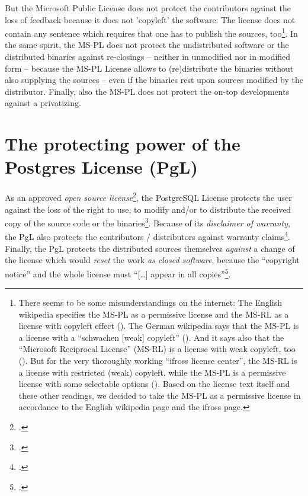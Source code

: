 But the Microsoft Public License does not protect the contributors against the
loss of feedback because it does not 'copyleft' the software: The license does
not contain any sentence which requires that one has to publish the sources,
too\footnote{There seems to be some misunderstandings on the internet: The
English wikipedia specifies the MS-PL as a permissive license and the MS-RL as a
license with copyleft effect (\cite[cf.][\nopage wp]{wpMsSharedSources2013a}).
The German wikipedia says that the MS-PL is a license with a \enquote{schwachen
[weak] copyleft} (\cite[cf.][\nopage wp]{wpMspl2013a}). And it says also that
the \enquote{Microsoft Reciprocal License} (MS-RL) is a license with weak
copyleft, too (\cite[cf.][\nopage wp]{wpMsrl2013a}). But for the very
thoroughly working \enquote{ifross license center}, the MS-RL is a license with
restricted (weak) copyleft, while the MS-PL is a permissive license with some
selectable options (\cite[cf.][\nopage wp]{ifross2011a}). Based on the license
text itself and these other readings, we decided to take the MS-PL as a
permissive license in accordance to the English wikipedia page and the ifross
page.}. In the same spirit, the MS-PL does not protect the undistributed
software or the distributed binaries against re-closings -- neither in
unmodified nor in modified form -- because the MS-PL License allows to
(re)distribute the binaries without also supplying the sources -- even if the
binaries rest upon sources modified by the distributor. Finally, also the MS-PL
does not protect the on-top developments against a privatizing.


\section{The protecting power of the Postgres License (PgL)}
\label{sec:ProtectingPowerOfPgl}

As an approved \emph{open source license}\footcite[cf.][\nopage wp]{OSI2012b},
the PostgreSQL License protects the user against the loss of the right to use,
to modify and/or to distribute the received copy of the source code or the
binaries\footcite[cf.][\nopage wp]{PglOsiLicense2013a}.
Because of its \emph{disclaimer of warranty}, the PgL also protects the
contributors / distributors against warranty claims\footcite[cf.][\nopage
wp]{PglOsiLicense2013a}. Finally, the PgL protects the distributed sources
themselves \emph{against} a change of the license which would \emph{reset} the
work \emph{as closed software}, because the \enquote{copyright notice} and the
whole license must \enquote{[\ldots] appear in all copies}\footcite[cf.][\nopage
wp]{PglOsiLicense2013a}.

